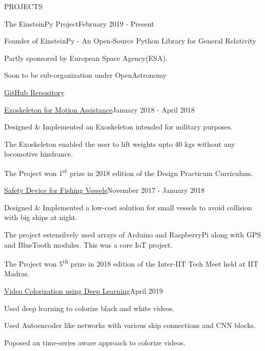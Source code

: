 \documentclass{resume} %
\begin{document}
\begin{rSection}{PROJECTS} 

\begin{rSubsection}{The EinsteinPy Project}{February 2019 - Present}{}{}
\item Founder of EinsteinPy - An Open-Source Python Library for General Relativity
\item Partly sponsored by European Space Agency(ESA).
\item Soon to be sub-organization under OpenAstronomy
\item \href{https://github.com/einsteinpy/einsteinpy}{GitHub Repository}
\end{rSubsection}

\begin{rSubsection}{\href{https://github.com/ritzvik/Miscellaneous-Projects/blob/master/design_practicum.pdf}{Exoskeleton for Motion Assistance}}{January 2018 - April 2018}{}{}
\item Designed \& Implemented an Exoskeleton intended for military purposes.
\item The Exoskeleton enabled the user to lift weights upto 40 kgs without any locomotive hindrance.
\item The Project won 1\textsuperscript{st} prize in 2018 edition of the Design Practicum Curriculum.
\end{rSubsection}

\begin{rSubsection}{\href{https://github.com/ritzvik/Miscellaneous-Projects/blob/master/techmeet.pdf}{Safety Device for Fishing Vessels}}{November 2017 - January 2018}{}{}
\item Designed \& Implemented a low-cost solution for small vessels to avoid
collision with big ships at night.
\item The project estensilvely used arrays of Arduino and RaspberryPi along with GPS and BlueTooth modules. This was a core IoT project.
\item The Project won 5\textsuperscript{th} prize in 2018 edition of the Inter-IIT Tech Meet held at IIT Madras.
\end{rSubsection}

\begin{rSubsection}{\href{https://github.com/ritzvik/DL-Video-Colorization}{Video Colorization using Deep Learning}}{April 2019}{}{}
\item Used deep learning to colorize black and white videos.
\item Used Autoencoder like networks with various skip connections and CNN blocks.
\item Poposed an time-series aware approach to colorize videos.
\end{rSubsection}


\end{rSection}
\end{document}
